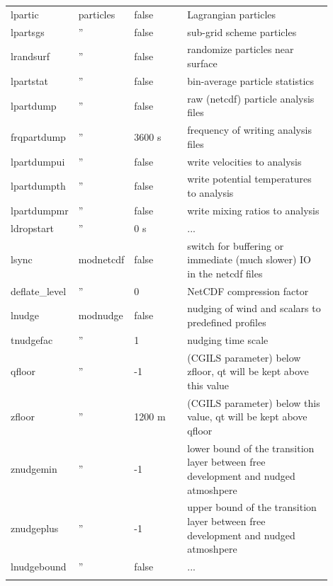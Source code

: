 \documentclass[11pt,a4paper]{article}
\begin{document}
\begin{longtable}[htb]{p{0.12\linewidth}p{0.1\linewidth}p{0.18\linewidth}p{0.5\linewidth}}
\hline
lpartic      & particles & false          & Lagrangian particles                                  \\
lpartsgs     &  ''  & false               & sub-grid scheme particles                             \\
lrandsurf    &  ''  & false               & randomize particles near surface                      \\
lpartstat    &  ''  & false               & bin-average particle statistics                       \\
lpartdump    &  ''  & false               & raw (netcdf) particle analysis files                  \\
frqpartdump  &  ''  & 3600 s              & frequency of writing analysis files                   \\                
lpartdumpui  &  ''  & false               & write velocities to analysis                          \\
lpartdumpth  &  ''  & false               & write potential temperatures to analysis              \\
lpartdumpmr  &  ''  & false               & write mixing ratios to analysis                       \\
ldropstart   &  ''  & 0 s                 & ...                                                   \\
\hline
lsync        & modnetcdf & false          & switch for buffering or immediate (much slower) IO in the netcdf files \\
deflate\_level&  ''  & 0                  & NetCDF compression factor                             \\
\hline
lnudge       & modnudge & false           & nudging of wind and scalars to predefined profiles    \\ 
tnudgefac    &  ''  & 1                   & nudging time scale                                    \\
qfloor       &  ''  & -1                  & (CGILS parameter) below zfloor, qt will be kept above this value \\
zfloor       &  ''  & 1200 m              & (CGILS parameter) below this value, qt will be kept above qfloor                                    \\
znudgemin    &  ''  & -1                  & lower bound of the transition layer between free development and nudged atmoshpere \\
znudgeplus   &  ''  & -1                  & upper bound of the transition layer between free development and nudged atmoshpere \\
lnudgebound  &  ''  & false               & ...                                                   \\
\hline
\hline
\label{tbl:namelist}
\end{longtable}
\end{document}
